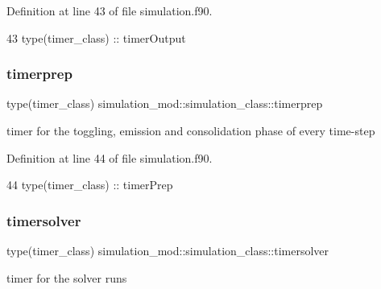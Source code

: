 Definition at line 43 of file simulation.\+f90.


\begin{DoxyCode}
43         \textcolor{keywordtype}{type}(timer\_class) :: timerOutput
\end{DoxyCode}
\mbox{\label{structsimulation__mod_1_1simulation__class_ac759ee5fda4ddfb16deeb833c59709e3}} 
\subsubsection{\texorpdfstring{timerprep}{timerprep}}
{\footnotesize\ttfamily type(timer\+\_\+class) simulation\+\_\+mod\+::simulation\+\_\+class\+::timerprep\hspace{0.3cm}{\ttfamily [private]}}



timer for the toggling, emission and consolidation phase of every time-\/step 



Definition at line 44 of file simulation.\+f90.


\begin{DoxyCode}
44         \textcolor{keywordtype}{type}(timer\_class) :: timerPrep
\end{DoxyCode}
\mbox{\label{structsimulation__mod_1_1simulation__class_a25e03717a6e87410b816ac1f299b282b}} 
\subsubsection{\texorpdfstring{timersolver}{timersolver}}
{\footnotesize\ttfamily type(timer\+\_\+class) simulation\+\_\+mod\+::simulation\+\_\+class\+::timersolver\hspace{0.3cm}{\ttfamily [private]}}



timer for the solver runs 



